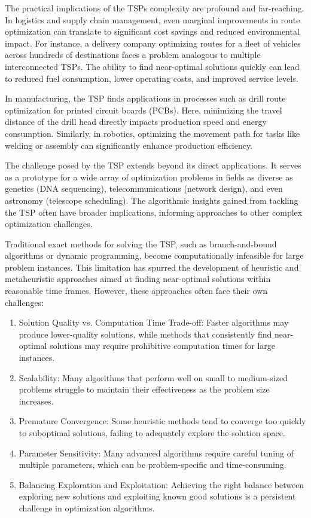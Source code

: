 \documentclass[
]{article}
\begin{document}
The practical implications of the TSP\textquotesingle s complexity are
profound and far-reaching. In logistics and supply chain management,
even marginal improvements in route optimization can translate to
significant cost savings and reduced environmental impact. For instance,
a delivery company optimizing routes for a fleet of vehicles across
hundreds of destinations faces a problem analogous to multiple
interconnected TSPs. The ability to find near-optimal solutions quickly
can lead to reduced fuel consumption, lower operating costs, and
improved service levels.

In manufacturing, the TSP finds applications in processes such as drill
route optimization for printed circuit boards (PCBs). Here, minimizing
the travel distance of the drill head directly impacts production speed
and energy consumption. Similarly, in robotics, optimizing the movement
path for tasks like welding or assembly can significantly enhance
production efficiency.

The challenge posed by the TSP extends beyond its direct applications.
It serves as a prototype for a wide array of optimization problems in
fields as diverse as genetics (DNA sequencing), telecommunications
(network design), and even astronomy (telescope scheduling). The
algorithmic insights gained from tackling the TSP often have broader
implications, informing approaches to other complex optimization
challenges.

Traditional exact methods for solving the TSP, such as branch-and-bound
algorithms or dynamic programming, become computationally infeasible for
large problem instances. This limitation has spurred the development of
heuristic and metaheuristic approaches aimed at finding near-optimal
solutions within reasonable time frames. However, these approaches often
face their own challenges:

\begin{enumerate}
\def\labelenumi{\arabic{enumi}.}
\item
  Solution Quality vs. Computation Time Trade-off: Faster algorithms may
  produce lower-quality solutions, while methods that consistently find
  near-optimal solutions may require prohibitive computation times for
  large instances.
\item
  Scalability: Many algorithms that perform well on small to
  medium-sized problems struggle to maintain their effectiveness as the
  problem size increases.
\item
  Premature Convergence: Some heuristic methods tend to converge too
  quickly to suboptimal solutions, failing to adequately explore the
  solution space.
\item
  Parameter Sensitivity: Many advanced algorithms require careful tuning
  of multiple parameters, which can be problem-specific and
  time-consuming.
\item
  Balancing Exploration and Exploitation: Achieving the right balance
  between exploring new solutions and exploiting known good solutions is
  a persistent challenge in optimization algorithms.
\end{enumerate}
\end{document}
